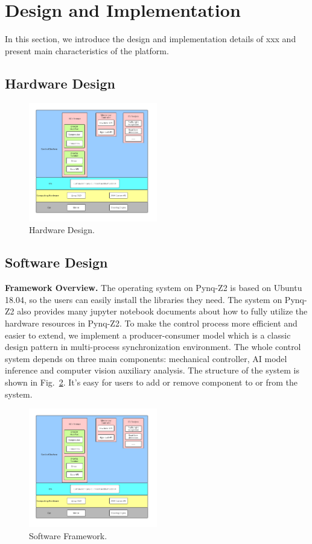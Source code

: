 \documentclass[conference]{IEEEtran}
\begin{document}
\section{Design and Implementation}
In this section, we introduce the design and implementation details of xxx and present main characteristics of the platform.

\subsection{Hardware Design}


\begin{figure}[htbp]
\centerline{\includegraphics[width=0.5\textwidth]{sf.jpg}}
\caption{Hardware Design.}
\label{hd}
\end{figure}

\subsection{Software Design}
\textbf{Framework Overview.} The operating system on Pynq-Z2 is based on Ubuntu 18.04, so the users can easily install the libraries they need. The system on Pynq-Z2 also provides many jupyter notebook documents about how to fully utilize the hardware resources in Pynq-Z2. To make the control process more efficient and easier to extend, we implement a producer-consumer model\cite{b18} which is a classic design pattern in multi-process synchronization environment. The whole control system depends on three main components: mechanical controller, AI model inference and computer vision auxiliary analysis. The structure of the system is shown in Fig.~\ref{sf}. It's easy for users to add or remove component to or from the system. 

\begin{figure}[htbp]
\centerline{\includegraphics[width=0.5\textwidth]{sf.jpg}}
\caption{Software Framework.}
\label{sf}
\end{figure}
\end{document}
